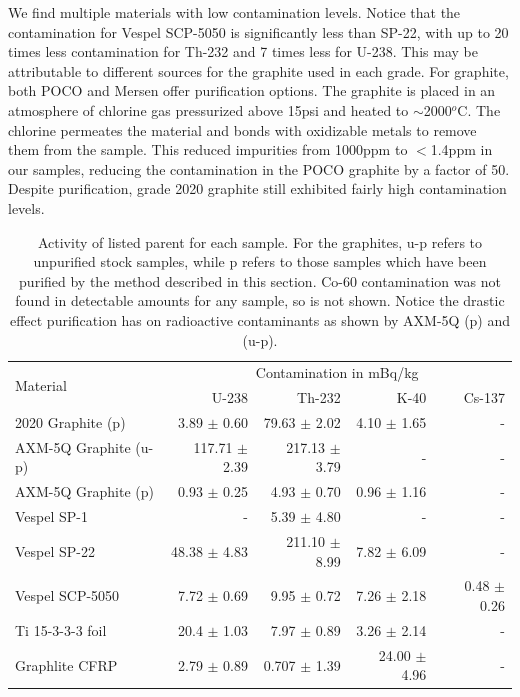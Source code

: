 \documentclass[final]{svjour2}
\begin{document}
We find multiple materials with low contamination levels. Notice that the contamination for Vespel SCP-5050 is significantly less than SP-22, with up to 20 times less contamination for Th-232 and 7 times less for U-238. This may be attributable to different sources for the graphite used in each grade. For graphite, both POCO and Mersen offer purification options. The graphite is placed in an atmosphere of chlorine gas pressurized above 15psi and heated to $\sim$2000$^o$C. The chlorine permeates the material and bonds with oxidizable metals to remove them from the sample. This reduced impurities from 1000ppm to $<$1.4ppm in our samples, reducing the contamination in the POCO graphite by a factor of 50. Despite purification, grade 2020 graphite still exhibited fairly high contamination levels.

\begin{table}[htb]
\centering
\begin{threeparttable}
\begin{tabular}{lrrrr}
\toprule
\multirow{2}{*}{\Large{Material}} & \multicolumn{4}{c}{\large{Contamination in mBq/kg}}\\
& U-238 & Th-232 & K-40 & Cs-137 \\\toprule
2020 Graphite (p) & 3.89 $\pm$ 0.60 & 79.63 $\pm$ 2.02 & 4.10 $\pm$ 1.65 &- \\
AXM-5Q Graphite (u-p) & 117.71 $\pm$ 2.39 & 217.13 $\pm$ 3.79 & -&-  \\
AXM-5Q Graphite (p) & 0.93 $\pm$ 0.25 & 4.93 $\pm$ 0.70 & 0.96 $\pm$ 1.16 & - \\
Vespel SP-1 & -& 5.39 $\pm$ 4.80 & -&-  \\
Vespel SP-22 & 48.38 $\pm$ 4.83 & 211.10 $\pm$ 8.99 & 7.82 $\pm$ 6.09 & -\\
Vespel SCP-5050 & 7.72 $\pm$ 0.69 & 9.95 $\pm$ 0.72 & 7.26 $\pm$ 2.18 & 0.48 $\pm$ 0.26 \\
Ti 15-3-3-3 foil & 20.4 $\pm$ 1.03 & 7.97 $\pm$ 0.89 &  3.26 $\pm$ 2.14 & - \\
Graphlite CFRP & 2.79 $\pm$ 0.89 & 0.707 $\pm$ 1.39 & 24.00 $\pm$ 4.96 & -\\
\bottomrule
\end{tabular}
 \caption{{\small Activity of listed parent for each sample. For the graphites, u-p refers to unpurified stock samples, while p refers to those samples which have been purified by the method described in this section. Co-60 contamination was not found in detectable amounts for any sample, so is not shown. Notice the drastic effect purification has on radioactive contaminants as shown by AXM-5Q (p) and (u-p). }}
\label{radioactivity}
\end{threeparttable}
\end{table}
\end{document}
